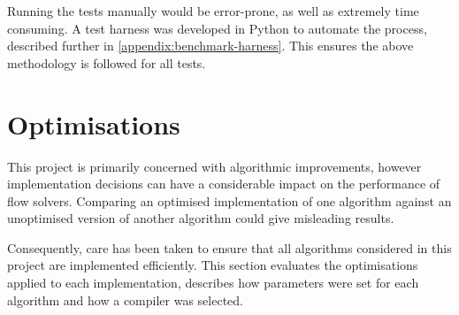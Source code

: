 Running the tests manually would be error-prone, as well as extremely time consuming. A test harness was developed in Python to automate the process, described further in \cref{appendix:benchmark-harness}. This ensures the above methodology is followed for all tests.



\section{Optimisations} \label{sec:eval-optimisations}

This project is primarily concerned with algorithmic improvements, however implementation decisions can have a considerable impact on the performance of flow solvers. Comparing an optimised implementation of one algorithm against an unoptimised version of another algorithm could give misleading results. 

Consequently, care has been taken to ensure that all algorithms considered in this project are implemented efficiently. This section evaluates the optimisations applied to each implementation, describes how parameters were set for each algorithm and how a compiler was selected.

%
%
%
%
%
%
%
